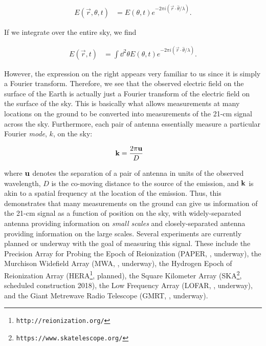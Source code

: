 \begin{align}
E(\vec{r},\theta,t) &= E(\theta,t)e^{-2\pi i (\vec{r} \cdot \hat{\theta}/\lambda)}.
\end{align}

If we integrate over the entire sky, we find

\begin{align}
E(\vec{r},t) &= \int \dd^{2} \theta E(\theta,t) e^{-2\pi i (\vec{r}\cdot \hat{\theta}/\lambda)}.
\end{align}

However, the expression on the right appears very familiar to us since it is simply a Fourier transform. Therefore, we see that the observed electric field on the surface of the Earth is actually just a Fourier transform of the electric field on the surface of the sky. This is basically what allows measurements at many locations on the ground to be converted into measurements of the 21-cm signal across the sky. Furthermore, each pair of antenna essentially measure a particular Fourier \textit{mode}, $k$, on the sky:

\begin{align}
{\bf k} &= \frac{2\pi {\bf u}}{D}
\end{align}

where ${\bf u}$ denotes the separation of a pair of antenna in units of the observed wavelength, $D$ is the co-moving distance to the source of the emission, and ${\bf k}$ is akin to a spatial frequency at the location of the emission. Thus, this demonstrates that many measurements on the ground can give us information of the 21-cm signal as a function of position on the sky, with widely-separated antenna providing information on \textit{small scales} and closely-separated antenna providing information on the large scales. Several experiments are currently planned or underway with the goal of measuring this signal. These include the Precision Array for Probing the Epoch of Reionization (PAPER, \citealt{Parsons2012}, underway), the Murchison Widefield Array (MWA, \citealt{Tingay2012}, underway), the Hydrogen Epoch of Reionization Array (HERA\footnote{{\tt http://reionization.org/}}, planned), the Square Kilometer Array (SKA\footnote{{\tt https://www.skatelescope.org/}}, scheduled construction 2018), the Low Frequency Array (LOFAR, \citealt{2013A&A...550A.136Y}, underway), and the Giant Metrewave Radio Telescope (GMRT, \citealt{Paciga2011}, underway).


